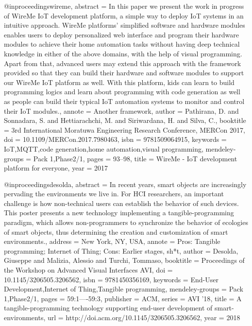 @inproceedings{wireme,
    abstract = {In this paper we present the work in progress of WireMe IoT development platform, a simple way to deploy IoT systems in an intuitive approach. WireMe platforms' simplified software and hardware modules enables users to deploy personalized web interface and program their hardware modules to achieve their home automation tasks without having deep technical knowledge in either of the above domains, with the help of visual programming. Apart from that, advanced users may extend this approach with the framework provided so that they can build their hardware and software modules to support our WireMe IoT platform as well. With this platform, kids can learn to build programming logics and learn about programming with code generation as well as people can build their typical IoT automation systems to monitor and control their IoT modules.},
    annote = {Another framework},
    author = {Pathirana, D. and Sonnadara, S. and Hettiarachchi, M. and Siriwardana, H. and Silva, C.},
    booktitle = {3rd International Moratuwa Engineering Research Conference, MERCon 2017},
    doi = {10.1109/MERCon.2017.7980463},
    isbn = {9781509064915},
    keywords = {IoT,MQTT,code generation,home automation,visual programming},
    mendeley-groups = {Pack 1,Phase2/1},
    pages = {93--98},
    title = {{WireMe - IoT development platform for everyone}},
    year = {2017}
}

@inproceedings{desolda,
    abstract = {In recent years, smart objects are increasingly pervading the environments we live in. For HCI researchers, an important challenge is how non-technical users can establish the behavior of such devices. This poster presents a new technology implementing a tangible-programming paradigm, which allows non-programmers to synchronize the behavior of ecologies of smart objects, thus determining the creation and customization of smart environments.},
    address = {New York, NY, USA},
    annote = {Pros: Tangible programming; Internet of Thing;
    Cons: Earlier stages, sh*t},
    author = {Desolda, Giuseppe and Malizia, Alessio and Turchi, Tommaso},
    booktitle = {Proceedings of the Workshop on Advanced Visual Interfaces AVI},
    doi = {10.1145/3206505.3206562},
    isbn = {9781450356169},
    keywords = {End-User Development,Internet of Thing,Tangible programming},
    mendeley-groups = {Pack 1,Phase2/1},
    pages = {59:1----59:3},
    publisher = {ACM},
    series = {AVI '18},
    title = {{A tangible-programming technology supporting end-user development of smart-environments}},
    url = {http://doi.acm.org/10.1145/3206505.3206562},
    year = {2018}
}

